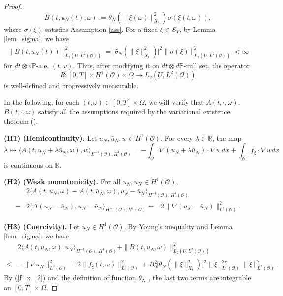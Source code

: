 \documentclass[reqno, 11pt]{amsart}
\theoremstyle{definition}
\numberwithin{equation}{section} \numberwithin{lem}{section}
\numberwithin{thm}{section} \numberwithin{prop}{section}
\numberwithin{cor}{section} \numberwithin{rem}{section}
\numberwithin{defn}{section}
\begin{document}
\begin{proof}
\[
B(t,u_N(t),\omega):=\theta_N(\|\xi(\omega)\|_{X_t}^2)\sigma(\xi(t,\omega)),
\]
where $\sigma(\xi)$ satisfies Assumption \ref{ass}. For a fixed $\xi\in S_T$, by Lemma \ref{lem_sigma}, we have 
\begin{align}\label{B}
\|B(t,u_N(t))\|_{L_2(U,L^2(\mathcal{O}))}^2=\big|\theta_N(\|\xi\|_{X_t}^2)\big|^2\|\sigma(\xi)\|_{L_2(U,L^2(\mathcal{O}))}^2< \infty
\end{align}
for $dt\otimes d\mathbb{P}$-a.e. $(t,\omega)$.
Thus, after modifying it on $dt\otimes d\mathbb{P}$-null set,  the operator $$B:[0,T]\times H^1(\mathcal {O})\times\Omega\to {L_2(U,L^2(\mathcal{O}))} $$ is well-defined and progressively measurable.

In the following, for each $(t,\omega)\in[0,T]\times\Omega$, we will verify that  $A(t,\cdot,\omega)$, $B(t,\cdot,\omega)$ satisfy all the assumptions required by the variational existence theorem (\cite{ liu2015stochastic,rockner2024well,krylov1981stochastic}).

\noindent\textbf{(H1) (Hemicontinuity).}
Let $u_{N},\bar{u}_N,w\in H^1(\mathcal {O})$. For every $\lambda\in\mathbb{R}$, the map
\[
\lambda\mapsto\big\langle A(t,u_N+\lambda \bar{u}_N,\omega),w\big\rangle_{H^{-1}{(\mathcal {O})},H^1{(\mathcal {O})}}
=
-\int_{\mathcal {O}}\nabla (u_N+\lambda \bar u_N)\cdot \nabla w\,dx+\int_{\mathcal {O}} f_\xi\cdot \nabla w dx
\]
is continuous on $\mathbb{R}$. 

\noindent\textbf{(H2) (Weak monotonicity).} For all $u_N,\bar  u_N\in H^1(\mathcal {O})$, 
\begin{align*}
	&2\big\langle A(t,u_N,\omega)-A(t,\bar 
 u_N,\omega),u_N-\bar u_N\big\rangle_{H^{-1}{(\mathcal {O})},H^1{(\mathcal {O})}}
	\\
	=&2\langle \Delta(u_N-\bar u_N),u_N-\bar u_N\rangle_{H^{-1}(\mathcal {O}),H^1(\mathcal {O})}
	=-2\|\nabla(u_N-\bar u_N)\|_{L^2(\mathcal O)}^2.
\end{align*}

\noindent\textbf{(H3) (Coercivity).}
Let $u_N\in H^1(\mathcal {O})$. By Young's inequality and  Lemma \ref{lem_sigma}, we have
\begin{align*}
    &2\big\langle A(t,u_N,\omega),u_N\big\rangle_{H^{-1}{(\mathcal {O})},H^1{(\mathcal {O})}}+\|B(t,u_N,\omega)\|_{L_2(U,L^2(\mathcal O))}^2\\\le&
-\|\nabla u_N\|_{L^2(\mathcal {O})}^2+2\|f_\xi(t,\omega)\|_{L^2(\mathcal {O})}^2+B_0^2\big|\theta_N(\|\xi\|_{X_t}^2)\big|^2\|\xi\|_{L^p(\mathcal{O})}^{2r}\|\xi\|_{L^2(\mathcal{O})}^2.
\end{align*}
By (\ref{f_xi_2}) and the definition of function $\theta_N$ , the last two terms are integrable on $[0,T]\times\Omega$.


\end{proof}
\end{document}
